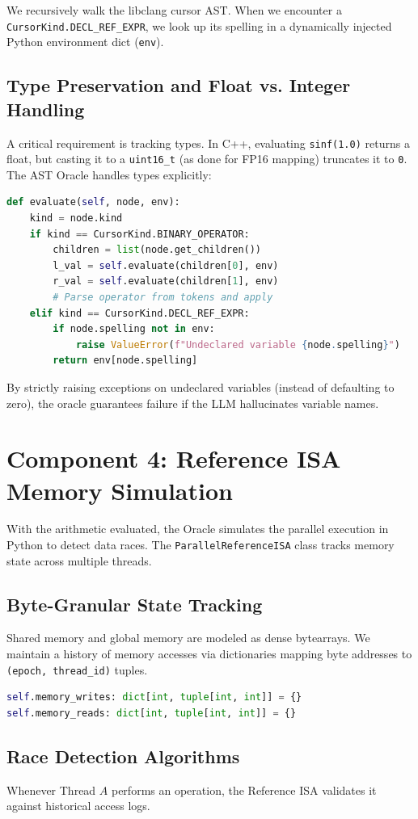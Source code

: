 \documentclass[10pt, conference, compsocconf]{IEEEtran}
\begin{document}
We recursively walk the libclang cursor AST. When we encounter a \texttt{CursorKind.DECL\_REF\_EXPR}, we look up its spelling in a dynamically injected Python environment dict (\texttt{env}).

\subsection{Type Preservation and Float vs. Integer Handling}
A critical requirement is tracking types. In C++, evaluating \texttt{sinf(1.0)} returns a float, but casting it to a \texttt{uint16\_t} (as done for FP16 mapping) truncates it to \texttt{0}. The AST Oracle handles types explicitly:
\begin{lstlisting}[language=Python]
def evaluate(self, node, env):
    kind = node.kind
    if kind == CursorKind.BINARY_OPERATOR:
        children = list(node.get_children())
        l_val = self.evaluate(children[0], env)
        r_val = self.evaluate(children[1], env)
        # Parse operator from tokens and apply
    elif kind == CursorKind.DECL_REF_EXPR:
        if node.spelling not in env:
            raise ValueError(f"Undeclared variable {node.spelling}")
        return env[node.spelling]
\end{lstlisting}
By strictly raising exceptions on undeclared variables (instead of defaulting to zero), the oracle guarantees failure if the LLM hallucinates variable names.

\section{Component 4: Reference ISA Memory Simulation}
With the arithmetic evaluated, the Oracle simulates the parallel execution in Python to detect data races. The \texttt{ParallelReferenceISA} class tracks memory state across multiple threads.

\subsection{Byte-Granular State Tracking}
Shared memory and global memory are modeled as dense bytearrays. We maintain a history of memory accesses via dictionaries mapping byte addresses to \texttt{(epoch, thread\_id)} tuples.
\begin{lstlisting}[language=Python]
self.memory_writes: dict[int, tuple[int, int]] = {}
self.memory_reads: dict[int, tuple[int, int]] = {}
\end{lstlisting}

\subsection{Race Detection Algorithms}
Whenever Thread $A$ performs an operation, the Reference ISA validates it against historical access logs.
\end{document}
